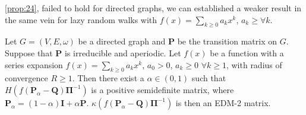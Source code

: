 \ref{prop:24}, failed to hold for directed
graphs, we can established a weaker result in the same vein for
lazy random walks with $f(x) = \sum_{k \geq 0}a_k x^k$, $a_k \geq
\forall k$. 
\begin{proposition}
  \label{prop:26}
  Let $G = (V,E,\omega)$ be a directed graph and $\mathbf{P}$ be the
  transition matrix on $G$. Suppose that $\mathbf{P}$ is irreducible
  and aperiodic. Let $f(x)$ be a function with a series expansion
  $f(x) = \sum_{k \geq 0}{a_k x^k}$, $a_0 > 0$, $a_k \geq 0\,\,
  \forall k \geq 1$, with radius of convergence $R \geq 1$. Then there
  exist a $\alpha \in (0,1)$ such that $H(f(\mathbf{P}_\alpha -
  \mathbf{Q}) \bm{\Pi}^{-1})$ is a positive semidefinite matrix, where
  $\mathbf{P}_\alpha = (1 - \alpha)\mathbf{I} + \alpha
  \mathbf{P}$. $\kappa( f(\mathbf{P}_\alpha -
  \mathbf{Q})\bm{\Pi}^{-1})$ is then an EDM-2 matrix.
\end{proposition}
